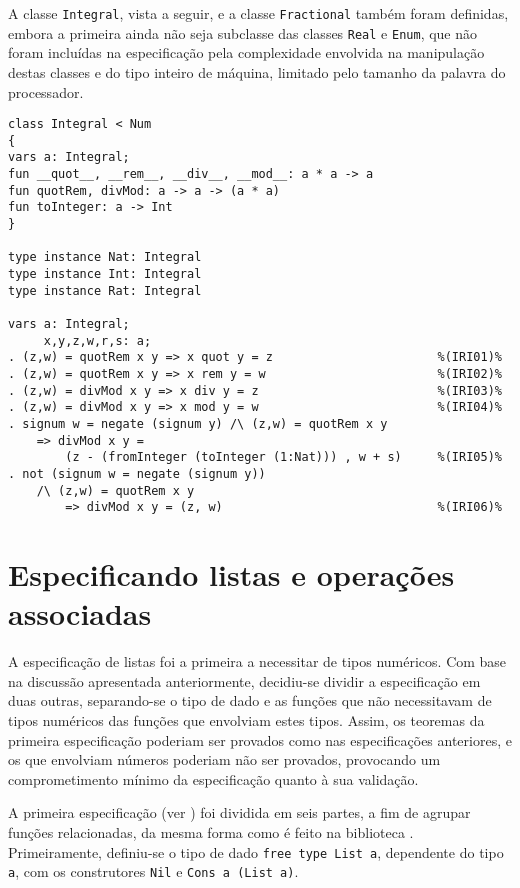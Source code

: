 A classe \Verb.Integral., vista a seguir, e a classe \Verb.Fractional. também foram definidas, embora a primeira ainda não seja subclasse das classes \Verb.Real. e \Verb.Enum., que não foram incluídas na especificação pela complexidade envolvida na manipulação destas classes e do tipo inteiro de máquina, limitado pelo tamanho da palavra do processador.

\begin{Verbatim}                                                 
class Integral < Num
{
vars a: Integral;
fun __quot__, __rem__, __div__, __mod__: a * a -> a
fun quotRem, divMod: a -> a -> (a * a)
fun toInteger: a -> Int
}

type instance Nat: Integral
type instance Int: Integral
type instance Rat: Integral

vars a: Integral;
     x,y,z,w,r,s: a;
. (z,w) = quotRem x y => x quot y = z                       %(IRI01)%
. (z,w) = quotRem x y => x rem y = w                        %(IRI02)%
. (z,w) = divMod x y => x div y = z                         %(IRI03)%
. (z,w) = divMod x y => x mod y = w                         %(IRI04)%
. signum w = negate (signum y) /\ (z,w) = quotRem x y   
    => divMod x y =                                     
        (z - (fromInteger (toInteger (1:Nat))) , w + s)     %(IRI05)%
. not (signum w = negate (signum y))                    
    /\ (z,w) = quotRem x y                              
        => divMod x y = (z, w)                              %(IRI06)%
\end{Verbatim}

\section{Especificando listas e operações associadas}
A especificação de listas foi a primeira a necessitar de tipos numéricos.
Com base na discussão apresentada anteriormente, decidiu-se dividir a especificação em duas outras, separando-se o tipo de dado e as funções que não necessitavam de tipos numéricos das funções que envolviam estes tipos.
Assim, os teoremas da primeira especificação poderiam ser provados como nas especificações anteriores, e os que envolviam números poderiam não ser provados, provocando um comprometimento mínimo da especificação quanto à sua validação.

A primeira especificação (ver ) foi dividida em seis partes, a fim de agrupar funções relacionadas, da mesma forma como é feito na biblioteca \Prelude.
Primeiramente, definiu-se o tipo de dado \Verb.free type List a., dependente do tipo \Verb.a., com os construtores \Verb.Nil. e \Verb.Cons a (List a)..

